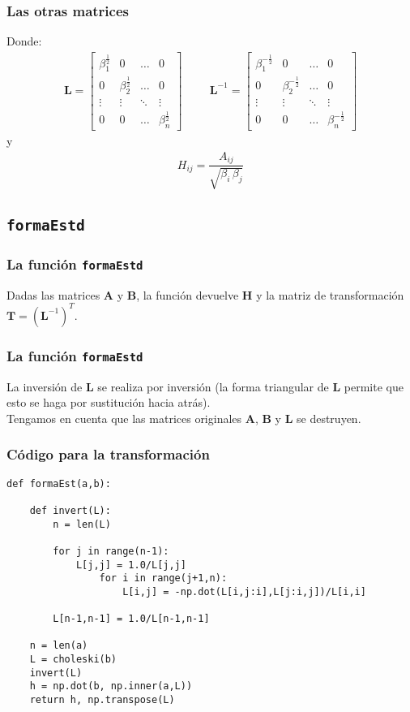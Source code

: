 \documentclass[12pt]{beamer}
\begin{document}
\begin{frame}
\frametitle{Las otras matrices}
Donde:
\pause
\renewcommand{\arraystretch}{1}
\begin{align}
\mathbf{L} =
\begin{bmatrix}
\beta_{1}^{\frac{1}{2}} & 0 & \ldots & 0 \\
0 & \beta_{2}^{\frac{1}{2}} & \ldots & 0 \\
\vdots & \vdots & \ddots & \vdots \\
0 & 0 & \ldots & \beta_{n}^{\frac{1}{2}}
\end{bmatrix}
\hspace{1cm}
\mathbf{L}^{-1} =
\begin{bmatrix}
\beta_{1}^{-\frac{1}{2}} & 0 & \ldots & 0 \\
0 & \beta_{2}^{-\frac{1}{2}} & \ldots & 0 \\
\vdots & \vdots & \ddots & \vdots \\
0 & 0 & \ldots & \beta_{n}^{-\frac{1}{2}}
\end{bmatrix}
\label{eq:ecuacion_09_26a}
\end{align}
y
\begin{align}
H_{ij} = \dfrac{A_{ij}}{\sqrt{\beta_{i} \, \beta_{j}}}
\end{align}
\end{frame}

\subsection{\texttt{formaEstd}}

\begin{frame}
\frametitle{La función \texttt{formaEstd}}
Dadas las matrices $\mathbf{A}$ y $\mathbf{B}$, la función  devuelve $\mathbf{H}$ y la matriz de transformación $\mathbf{T} = (\mathbf{L}^{-1})^{T}$.
\end{frame}
\begin{frame}
\frametitle{La función \texttt{formaEstd}}
La inversión de $\mathbf{L}$ se realiza por inversión (la forma triangular de $\mathbf{L}$ permite que esto se haga por sustitución hacia atrás).
\\
\bigskip
\pause
Tengamos en cuenta que las matrices originales $\mathbf{A}$, $\mathbf{B}$ y $\mathbf{L}$ se destruyen.
\end{frame}
\begin{frame}
\frametitle{Código para la transformación}
\begin{lstlisting}[caption=Código para la forma estándar]
def formaEst(a,b):

    def invert(L):
        n = len(L)
        
        for j in range(n-1):
            L[j,j] = 1.0/L[j,j]
                for i in range(j+1,n):
                    L[i,j] = -np.dot(L[i,j:i],L[j:i,j])/L[i,i]

        L[n-1,n-1] = 1.0/L[n-1,n-1]
    
    n = len(a)
    L = choleski(b)
    invert(L)
    h = np.dot(b, np.inner(a,L))
    return h, np.transpose(L)
\end{lstlisting}
\end{frame}
\end{document}
